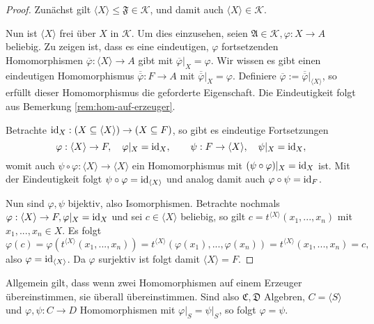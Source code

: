 \begin{proof}
    Zunächst gilt $ \langle X \rangle \leq \mathfrak{F} \in \mathcal{K} $, und damit auch $ \langle X \rangle \in \mathcal{K} $.

    Nun ist $ \langle X \rangle $ frei über $X$ in $\mathcal{K}$. Um dies einzusehen, seien $\mathfrak{A} \in \mathcal{K}, \varphi : X \to A$ beliebig. Zu zeigen ist, dass es eine eindeutigen, $\varphi$ fortsetzenden Homomorphismen $\overline{\varphi} : \langle X \rangle \to A$ gibt mit $\overline{\varphi} \vert_X = \varphi$. Wir wissen es gibt einen eindeutigen Homomorphismus $\overline{\overline{\varphi}} : F \to A$ mit $\overline{\overline{\varphi}} \vert_X = \varphi$. Definiere $\overline{\varphi} := \overline{\overline{\varphi}} \vert_{\langle X \rangle}$, so erfüllt dieser Homomorphismus die geforderte Eigenschaft. Die Eindeutigkeit folgt aus Bemerkung \ref{rem:hom-auf-erzeuger}.

    Betrachte $\operatorname{id}_X : (X \subseteq \langle X \rangle) \to (X \subseteq F)$, so gibt es eindeutige Fortsetzungen
    $$ \varphi : \langle X \rangle \to F, \quad \varphi \vert_X = \operatorname{id}_X, \quad\quad \psi : F \to \langle X \rangle, \quad \psi \vert_X = \operatorname{id}_X, $$
    womit auch $\psi \circ \varphi : \langle X \rangle \to \langle X \rangle$ ein Homomorphismus mit $(\psi \circ \varphi) \vert_X = \operatorname{id}_X$ ist. Mit der Eindeutigkeit folgt $\psi \circ \varphi = \operatorname{id}_{\langle X \rangle}$ und analog damit auch $\varphi \circ \psi = \operatorname{id}_F$.

    Nun sind $\varphi, \psi$ bijektiv, also Isomorphismen. Betrachte nochmals $\varphi : \langle X \rangle \to F, \varphi \vert_X = \operatorname{id}_X$ und sei $c \in \langle X \rangle$ beliebig, so gilt $c = t^{\langle X \rangle}(x_1, ..., x_n)$ mit $x_1, ..., x_n \in X$. Es folgt
    $$ \varphi(c) = \varphi(t^{\langle X \rangle}(x_1, ..., x_n)) = t^{\langle X \rangle}(\varphi(x_1), ..., \varphi(x_n)) = t^{\langle X \rangle}(x_1, ..., x_n) = c, $$
    also $\varphi = \operatorname{id}_{\langle X \rangle}$. Da $\varphi$ surjektiv ist folgt damit $\langle X \rangle = F$.
\end{proof}

\begin{remark} \label{rem:hom-auf-erzeuger}
    Allgemein gilt, dass wenn zwei Homomorphismen auf einem Erzeuger über\-einstimmen, sie überall übereinstimmen. Sind also $\mathfrak{C}, \mathfrak{D}$ Algebren, $C = \langle S \rangle$ und $\varphi, \psi : C \to D$ Homomorphismen mit $\varphi \vert_S = \psi \vert_S$, so folgt $\varphi = \psi$.
\end{remark}

